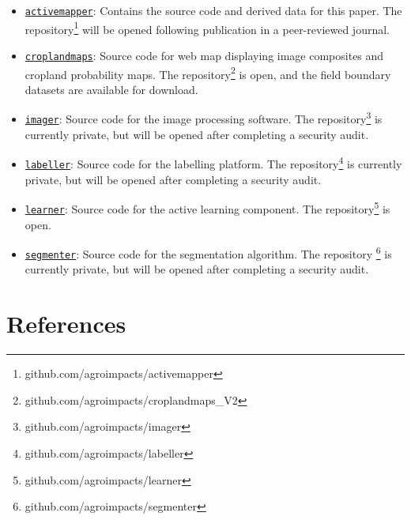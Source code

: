 \documentclass[
  11pt,
  a4paper]{article}
\providecommand{\tightlist}{%
  \setlength{\itemsep}{0pt}\setlength{\parskip}{0pt}}
\begin{document}
\begin{itemize}
\tightlist
\item
  \href{https://github.com/agroimpacts/activemapper}{\texttt{activemapper}}:
  Contains the source code and derived data for this paper. The
  repository\footnote{github.com/agroimpacts/activemapper} will be
  opened following publication in a peer-reviewed journal.
\item
  \href{https://github.com/agroimpacts/croplandmaps_V2}{\texttt{croplandmaps}}:
  Source code for web map displaying image composites and cropland
  probability maps. The
  repository\footnote{github.com/agroimpacts/croplandmaps\_V2} is open,
  and the field boundary datasets are available for download.
\item
  \href{https:github.com/agroimpacts/imager}{\texttt{imager}}: Source
  code for the image processing software. The
  repository\footnote{github.com/agroimpacts/imager} is currently
  private, but will be opened after completing a security audit.
\item
  \href{https:github.com/agroimpacts/labeller}{\texttt{labeller}}:
  Source code for the labelling platform. The
  repository\footnote{github.com/agroimpacts/labeller} is currently
  private, but will be opened after completing a security audit.
\item
  \href{https:github.com/agroimpacts/learner}{\texttt{learner}}: Source
  code for the active learning component. The
  repository\footnote{github.com/agroimpacts/learner} is open.
\item
  \href{https:github.com/agroimpacts/segmenter}{\texttt{segmenter}}:
  Source code for the segmentation algorithm. The repository
  \footnote{github.com/agroimpacts/segmenter} is currently private, but
  will be opened after completing a security audit.
\end{itemize}

\clearpage

\hypertarget{references}{%
\section{References}\label{references}}

\singlespace
\end{document}
